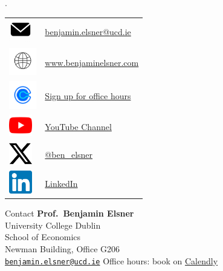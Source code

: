 \documentclass[
  ignorenonframetext,
  aspectratio=169, handout]{beamer}
\begin{document}
\begin{frame}{.}
\protect\hypertarget{section}{}
\begin{large}
\begin{tabular}{m{1cm} l}
  \includegraphics[width=1cm]{../Templates/emailicon.png} & \href{mailto:benjamin.elsner@ucd.ie}{benjamin.elsner@ucd.ie} \\
  \includegraphics[width=1.2cm]{../Templates/interneticon.jpeg} & \href{https://benjaminelsner.com}{www.benjaminelsner.com} \\   
  \includegraphics[width=1.2cm]{../Templates/calendlyicon.png} & \href{https://calendly.com/benjamin-elsner/office-hour}{Sign up for office hours} \\  
  \includegraphics[width=1cm]{../Templates/youtubeicon.png} & \href{www.youtube.com/@ben_elsner}{YouTube Channel} \\    
  \includegraphics[width=1cm]{../Templates/xicon.png} & \href{https://twitter.com/ben_elsner}{@ben\_elsner} \\ 
    \includegraphics[width=1cm]{../Templates/linkedinicon.png} & \href{www.linkedin.com/in/benjamin-elsner-b71b98bb}{LinkedIn} \\     
\end{tabular}
\end{large}
\end{frame}

\begin{frame}{Contact}
\protect\hypertarget{contact}{}
\textbf{Prof.~Benjamin Elsner}\\
University College Dublin\\
School of Economics\\
Newman Building, Office G206\\
\href{mailto:benjamin.elsner@ucd.ie}{\nolinkurl{benjamin.elsner@ucd.ie}}
\vfill Office hours: book on
\href{https://calendly.com/benjamin-elsner/office-hour}{Calendly}
\end{frame}
\end{document}
